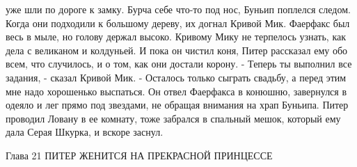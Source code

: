 уже шли по дороге к замку. Бурча себе что-то под нос, Буньип поплелся 
следом.
    Когда они подходили к большому дереву, их догнал Кривой Мик. 
Фаерфакс был весь в мыле, но голову держал высоко.
    Кривому Мику не терпелось узнать, как дела с великаном и 
колдуньей. И пока он чистил коня, Питер рассказал ему обо всем, что 
случилось, и о том, как они достали корону.
    - Теперь ты выполнил все задания, - сказал Кривой Мик. - Осталось 
только сыграть свадьбу, а перед этим мне надо хорошенько выспаться.
    Он отвел Фаерфакса в конюшню, завернулся в одеяло и лег прямо под 
звездами, не обращая внимания на храп Буньипа. Питер проводил Ловану в 
ее комнату, тоже забрался в спальный мешок, который ему дала Серая 
Шкурка, и вскоре заснул.

        Глава 21
        ПИТЕР ЖЕНИТСЯ НА ПРЕКРАСНОЙ ПРИНЦЕССЕ

